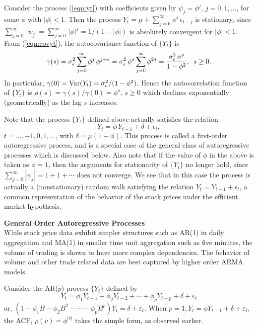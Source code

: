 \begin{ex}\label{ex:autoregor1}
Consider the process (\ref{eqn:yt}) with coefficients given by $\psi_j = \phi^j$, $j=0,1,\ldots$,  for some $\phi$ with $\lvert\phi\rvert<1$. Then the process $Y_t = \mu + \sum_{j=0}^{\infty} \phi^j \, \epsilon_{t-j}$ is stationary, since $\sum_{j=0}^{\infty} \, \lvert\psi_j\rvert= \sum_{j=0}^{\infty} \, \lvert\phi\rvert^j = 1/(1-\lvert\phi\rvert)$ is absolutely convergent for $\lvert\phi\rvert < 1$. From (\ref{eqn:covyt}), the autocovariance function of $\{Y_t\}$ is
	\[
	\gamma(s)= \sigma^2_{\epsilon} \sum_{j=0}^{\infty} \phi^j \, \phi^{j+s}= \sigma^2_{\epsilon} \, \phi^s \sum_{j=0}^{\infty} \phi^{2j}= \frac{\sigma^2_{\epsilon} \, \phi^s}{1 - \phi^2}, \enskip s \geq 0.
	\]
In particular, $\gamma(0) = \operatorname{Var}(Y_t) = \sigma^2_{\epsilon}/(1-\phi^2)$. Hence the autocorrelation function of $\{Y_t\}$ is $\rho(s)= \gamma(s)/\gamma(0)= \phi^s$, $ s \geq 0$ which declines exponentially (geometrically) as the lag $s$ increases.

Note that the process $\{Y_t\}$ defined above actually satisfies the relation 
	\[
	Y_t= \phi \, Y_{t-1} + \delta+\epsilon_t,
	\]
$t=\ldots,-1,0,1,\ldots$, with $\delta = \mu(1-\phi)$. This process is called a first-order autoregressive process, and is a special case of the general class of autoregressive processes which is discussed below. Also note that if the value of $\phi$ in the above is taken as  $\phi = 1$, then the arguments for stationarity of $\{Y_t\}$ no longer hold, since $\sum_{j=0}^{\infty} |\psi_j| = 1+1+\cdots$ does not converge. We see that in this case the process is actually a (nonstationary) random walk satisfying the relation  $Y_t = Y_{t-1}+\epsilon_t$, a common representation of the behavior of the stock prices under the efficient market hypothesis. 
\end{ex}


\noindent\textbf{General Order Autoregressive Processes} \\

While stock price data exhibit simpler structures such as AR(1) in daily aggregation and MA(1) in smaller time unit aggregation such as five minutes, the volume of trading is shown to have more complex dependencies. The behavior of volume and other trade related data are best captured by higher order ARMA models. 

Consider the AR($p$) process $\{Y_t\}$ defined by
	\begin{equation}\label{eqn:ytsum}
	Y_t = \phi_1Y_{t-1} + \phi_2Y_{t-2} +\cdots + \phi_pY_{t-p} + \delta + \varepsilon_t
	\end{equation}
or, $(1-\phi_1B - \phi_2B^2 - \cdots - \phi_pB^p)Y_t = \delta + \varepsilon_t$. When $p=1, Y_t = \phi Y_{t-1} + \delta + \varepsilon_t$, the ACF, $\rho(v)=\phi^{\lvert \nu \rvert}$ takes the simple form, as observed earlier.



